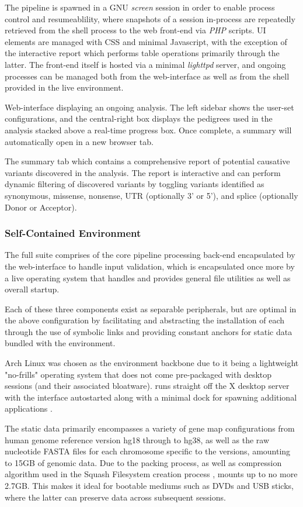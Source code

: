 The pipeline is spawned in a GNU \textit{screen} session in order to enable process control and resumeablility, where snapshots of a session in-process are repeatedly retrieved from the shell process to the web front-end via \textit{PHP} scripts. UI elements are managed with CSS and minimal Javascript, with the exception of the interactive report which performs table operations primarily through the latter. The front-end itself is hosted via a minimal \textit{lighttpd} server, and ongoing \app processes can be managed both from the web-interface as well as from the shell provided in the live environment.

{Web-interface displaying an ongoing analysis. The left sidebar shows the user-set configurations, and the central-right box displays the pedigrees used in the analysis stacked above a real-time progress box. Once complete, a summary will automatically open in a new browser tab.}

{The summary tab which contains a comprehensive report of potential causative variants discovered in the analysis. The report is interactive and can perform dynamic filtering of discovered variants by toggling variants identified as synonymous, missense, nonsense, UTR (optionally 3' or 5'), and splice (optionally Donor or Acceptor).}



\subsubsection{Self-Contained Environment}

The full \app suite comprises of the core pipeline processing back-end encapsulated by the web-interface to handle input validation, which is encapsulated once more by a live operating system that handles and provides general file utilities as well as overall startup.

Each of these three components exist as separable peripherals, but are optimal in the above configuration by facilitating and abstracting the installation of each through the use of symbolic links and providing constant anchors for static data bundled with the environment.

Arch Linux was chosen as the environment backbone due to it being a lightweight "no-frills" operating system that does not come pre-packaged with desktop sessions (and their associated bloatware). \app runs straight off the X desktop server with the \app interface autostarted along with a minimal dock for spawning additional applications \citep{scheifler1986x}.

The static data primarily encompasses a variety of gene map configurations from human genome reference version hg18 through to hg38, as well as the raw nucleotide FASTA files for each chromosome specific to the versions, amounting to 15GB of genomic data. Due to the packing process, as well as compression algorithm used in the Squash Filesystem creation process \citep{lougher2008squashfs}, \app mounts up to no more 2.7GB. This makes it ideal for bootable mediums such as DVDs and USB sticks, where the latter can preserve data across subsequent sessions.

